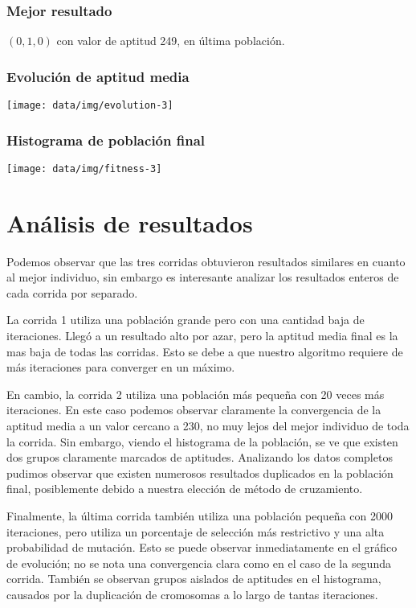 \documentclass[a4paper,12pt]{article}
\begin{document}
\subsubsection*{Mejor resultado}

$(0, 1, 0)$ con valor de aptitud 249, en última población.

\subsubsection*{Evolución de aptitud media}

\texttt{[image: data/img/evolution-3]}

\subsubsection*{Histograma de población final}

\texttt{[image: data/img/fitness-3]}

\restoregeometry

\section{Análisis de resultados}

Podemos observar que las tres corridas obtuvieron resultados similares en cuanto al mejor individuo, sin embargo es interesante analizar los resultados enteros de cada corrida por separado.

La corrida 1 utiliza una población grande pero con una cantidad baja de iteraciones.
Llegó a un resultado alto por azar, pero la aptitud media final es la mas baja de todas las corridas.
Esto se debe a que nuestro algoritmo requiere de más iteraciones para converger en un máximo.

En cambio, la corrida 2 utiliza una población más pequeña con 20 veces más iteraciones. En este caso podemos observar claramente la convergencia de la aptitud media a un valor cercano a 230, no muy lejos del mejor individuo de toda la corrida.
Sin embargo, viendo el histograma de la población, se ve que existen dos grupos claramente marcados de aptitudes.
Analizando los datos completos pudimos observar que existen numerosos resultados duplicados en la población final, posiblemente debido a nuestra elección de método de cruzamiento.

Finalmente, la última corrida también utiliza una población pequeña con 2000 iteraciones, pero utiliza un porcentaje de selección más restrictivo y una alta probabilidad de mutación.
Esto se puede observar inmediatamente en el gráfico de evolución; no se nota una convergencia clara como en el caso de la segunda corrida.
También se observan grupos aislados de aptitudes en el histograma, causados por la duplicación de cromosomas a lo largo de tantas iteraciones.
\end{document}
